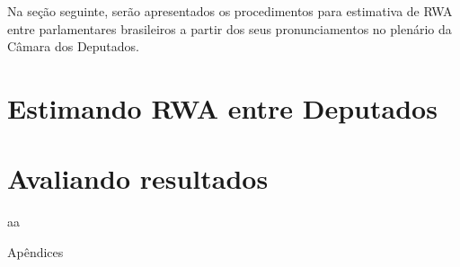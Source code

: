 \documentclass[
12pt,				%
openright,			%
twoside,			%
a4paper,			%
english,			%
french,				%
spanish,			%
brazil				%
]{abntex2}
\begin{document}
Na seção seguinte, serão apresentados os procedimentos para estimativa de RWA entre parlamentares brasileiros a partir dos seus pronunciamentos no plenário da Câmara dos Deputados.

\section{Estimando RWA entre Deputados}


\section{Avaliando resultados}

aa
\postextual



%
%


Apêndices

\printindex
\end{document}
